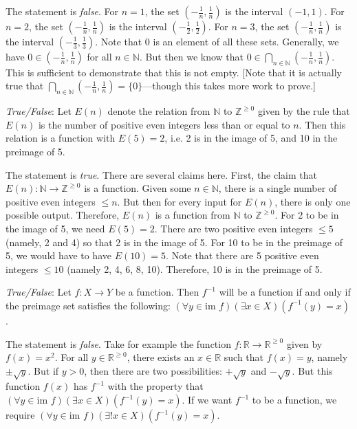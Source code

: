 \documentclass[11pt,letterpaper]{article}
\begin{document}
\sol The statement is \textit{false}. For $n= 1$, the set $(-\frac{1}{n}, \frac{1}{n})$ is the interval $(-1, 1)$. For $n= 2$, the set $(-\frac{1}{n}, \frac{1}{n})$ is the interval $(-\frac{1}{2}, \frac{1}{2})$. For $n= 3$, the set $(-\frac{1}{n}, \frac{1}{n})$ is the interval $(-\frac{1}{3}, \frac{1}{3})$. Note that $0$ is an element of all these sets. Generally, we have $0 \in (-\frac{1}{n}, \frac{1}{n})$ for all $n \in \mathbb{N}$. But then we know that $0 \in \displaystyle\bigcap_{n \in \mathbb{N}} \left( -\frac{1}{n}, \frac{1}{n} \right)$. This is sufficient to demonstrate that this is not empty. [Note that it is actually true that $\displaystyle\bigcap_{n \in \mathbb{N}} \left( -\frac{1}{n}, \frac{1}{n} \right)= \{ 0 \}$---though this takes more work to prove.] \pvspace{1.5cm}



\quizsol \textit{True/False}: Let $E(n)$ denote the relation from $\mathbb{N}$ to $\mathbb{Z}^{\geq 0}$ given by the rule that $E(n)$ is the number of positive even integers less than or equal to $n$. Then this relation is a function with $E(5)= 2$, i.e. 2 is in the image of 5, and 10 in the preimage of 5. \pspace

\sol The statement is \textit{true}. There are several claims here. First, the claim that $E(n): \mathbb{N} \to \mathbb{Z}^{\geq 0}$ is a function. Given some $n \in \mathbb{N}$, there is a single number of positive even integers $\leq n$. But then for every input for $E(n)$, there is only one possible output. Therefore, $E(n)$ is a function from $\mathbb{N}$ to $\mathbb{Z}^{\geq 0}$. For 2 to be in the image of 5, we need $E(5)= 2$. There are two positive even integers $\leq 5$ (namely, 2 and 4) so that 2 is in the image of 5. For 10 to be in the preimage of 5, we would have to have $E(10)= 5$. Note that there are 5 positive even integers $\leq 10$ (namely 2, 4, 6, 8, 10). Therefore, 10 is in the preimage of 5. \pvspace{1.5cm}



\quizsol \textit{True/False}: Let $f: X \to Y$ be a function. Then $f^{-1}$ will be a function if and only if the preimage set satisfies the following: $(\forall y \in \text{im } f)(\exists x \in X)(f^{-1}(y)= x)$. \pspace

\sol The statement is \textit{false}. Take for example the function $f: \mathbb{R} \to \mathbb{R}^{\geq 0}$ given by $f(x)= x^2$. For all $y \in \mathbb{R}^{\geq 0}$, there exists an $x \in \mathbb{R}$ such that $f(x)= y$, namely $\pm\sqrt{y}$. But if $y > 0$, then there are two possibilities: $+\sqrt{y}$ and $-\sqrt{y}$. But this function $f(x)$ has $f^{-1}$ with the property that $(\forall y \in \text{im }f)(\exists x \in X)(f^{-1}(y)= x)$. If we want $f^{-1}$ to be a function, we require $(\forall y \in \text{im }f)(\exists! x \in X)(f^{-1}(y)= x)$. 
\end{document}
